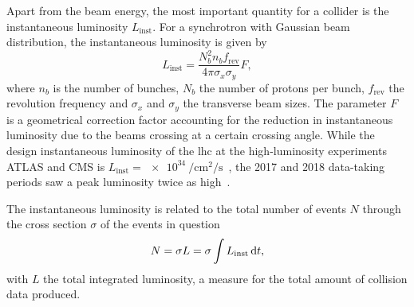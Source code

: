 Apart from the beam energy, the most important quantity for a collider is the instantaneous luminosity $L_\mathrm{inst}$. For a synchrotron with Gaussian beam distribution, the instantaneous luminosity is given by
\begin{equation}
	L_\mathrm{inst} = \frac{N_b^2 n_b f_\mathrm{rev}}{4\pi\sigma_x\sigma_y} F,
	\label{eq:lumi}
\end{equation}
where $n_b$ is the number of bunches, $N_b$ the number of protons per bunch, $f_\mathrm{rev}$ the revolution frequency and $\sigma_x$ and $\sigma_y$ the transverse beam sizes.
The parameter $F$ is a geometrical correction factor accounting for the reduction in instantaneous luminosity due to the beams crossing at a certain crossing angle.
While the design instantaneous luminosity of the \gls{lhc} at the high-luminosity experiments ATLAS and CMS is $L_\mathrm{inst} = \SI{e34}{\per\cm\squared\per\second}$~\cite{Bruning:782076}, the 2017 and 2018 data-taking periods saw a peak luminosity twice as high~\cite{peak_lumi}.

The instantaneous luminosity is related to the total number of events $N$ through the cross section $\sigma$ of the events in question
\begin{equation}
	N = \sigma L = \sigma \int L_\mathrm{inst}\mathop{}\!\mathrm{d} t,
\end{equation}
with $L$ the total integrated luminosity, a measure for the total amount of collision data produced.

